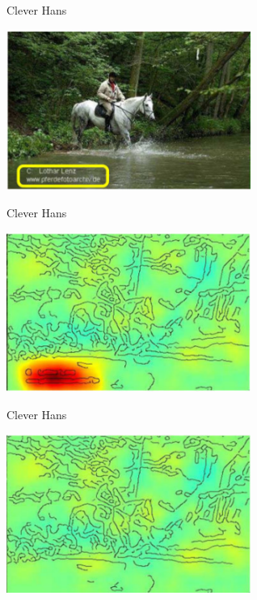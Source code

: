 \documentclass[aspectratio=169]{../latex_main/tntbeamer}  %
\begin{document}
\begin{frame}[c]{Clever Hans }
	
	\centering
	\includegraphics[width=0.6\textwidth]{w01_introduction/figure/horse_with_label.PNG}
	
\end{frame}

\begin{frame}[c]{Clever Hans }
	
	\centering
	\includegraphics[width=0.6\textwidth]{w01_introduction/figure/horse_map_with_label.PNG}
	
\end{frame}

\begin{frame}[c]{Clever Hans }
	
	\centering
	\includegraphics[width=0.6\textwidth]{w01_introduction/figure/horse_map_without_label.PNG}
	
\end{frame}
\end{document}
